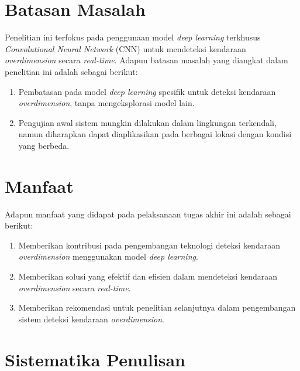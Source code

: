 \section{Batasan Masalah}
\label{sec:batasanmasalah}

Penelitian ini terfokus pada penggunaan model \emph{deep learning} terkhusus \emph{Convolutional Neural Network} (CNN) untuk mendeteksi kendaraan \emph{overdimension} secara \emph{real-time}. Adapun batasan masalah yang diangkat dalam penelitian ini adalah sebagai berikut:

\begin{enumerate}[nolistsep]

  \item Pembatasan pada model \emph{deep learning} spesifik untuk deteksi kendaraan \emph{overdimension}, tanpa mengeksplorasi model lain.
  
  \item Pengujian awal sistem mungkin dilakukan dalam lingkungan terkendali, namun diharapkan dapat diaplikasikan pada berbagai lokasi dengan kondisi yang berbeda.
  
\end{enumerate}

\section{Manfaat}
\label{sec:manfaatpenulisan}

Adapun manfaat yang didapat pada pelaksanaan tugas akhir ini adalah sebagai berikut:

\begin{enumerate}[nolistsep]

  \item Memberikan kontribusi pada pengembangan teknologi deteksi kendaraan \emph{overdimension} menggunakan model \emph{deep learning}.
  
  \item Memberikan solusi yang efektif dan efisien dalam mendeteksi kendaraan \emph{overdimension} secara \emph{real-time}.
  
  \item Memberikan rekomendasi untuk penelitian selanjutnya dalam pengembangan sistem deteksi kendaraan \emph{overdimension}.
  
\end{enumerate}

\section{Sistematika Penulisan}
\label{sec:sistematikapenulisan
}

